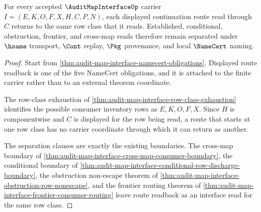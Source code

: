 \begin{theorem}
\label{thm:audit-map-interface-route-readback-totality}
For every accepted $\AuditMapInterfaceUp$ carrier $I=(E,K,O,F,X,H,C,P,N)$, each displayed continuation route read through $C$ returns to the same row class that it reads. Established, conditional, obstruction, frontier, and cross-map reads therefore remain separated under $\hsame$ transport, $\Cont$ replay, $\Pkg$ provenance, and local $\NameCert$ naming.
\end{theorem}
\begin{proof}
Start from \autoref{thm:audit-map-interface-namecert-obligations}. Displayed route readback is one of the five NameCert obligations, and it is attached to the finite carrier rather than to an external theorem coordinate.

The row-class exhaustion of \autoref{thm:audit-map-interface-row-class-exhaustion} identifies the possible consumer inventory rows as $E,K,O,F,X$. Since $H$ is componentwise and $C$ is displayed for the row being read, a route that starts at one row class has no carrier coordinate through which it can return as another.

The separation clauses are exactly the existing boundaries. The cross-map boundary of \autoref{thm:audit-map-interface-cross-map-consumer-boundary}, the conditional boundary of \autoref{thm:audit-map-interface-conditional-row-discharge-boundary}, the obstruction non-escape theorem of \autoref{thm:audit-map-interface-obstruction-row-nonescape}, and the frontier routing theorem of \autoref{thm:audit-map-interface-frontier-consumer-routing} leave route readback as an interface read for the same row class.
\end{proof}

